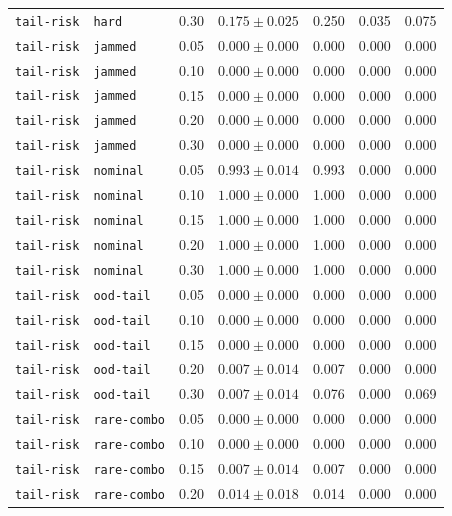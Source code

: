 \documentclass{article}
\begin{document}
\begin{center}
\begin{tabular}{lllcccc}
\texttt{tail-risk} & \texttt{hard} & 0.30 & $0.175 \pm 0.025$ & 0.250 & 0.035 & 0.075 \\
\texttt{tail-risk} & \texttt{jammed} & 0.05 & $0.000 \pm 0.000$ & 0.000 & 0.000 & 0.000 \\
\texttt{tail-risk} & \texttt{jammed} & 0.10 & $0.000 \pm 0.000$ & 0.000 & 0.000 & 0.000 \\
\texttt{tail-risk} & \texttt{jammed} & 0.15 & $0.000 \pm 0.000$ & 0.000 & 0.000 & 0.000 \\
\texttt{tail-risk} & \texttt{jammed} & 0.20 & $0.000 \pm 0.000$ & 0.000 & 0.000 & 0.000 \\
\texttt{tail-risk} & \texttt{jammed} & 0.30 & $0.000 \pm 0.000$ & 0.000 & 0.000 & 0.000 \\
\texttt{tail-risk} & \texttt{nominal} & 0.05 & $0.993 \pm 0.014$ & 0.993 & 0.000 & 0.000 \\
\texttt{tail-risk} & \texttt{nominal} & 0.10 & $1.000 \pm 0.000$ & 1.000 & 0.000 & 0.000 \\
\texttt{tail-risk} & \texttt{nominal} & 0.15 & $1.000 \pm 0.000$ & 1.000 & 0.000 & 0.000 \\
\texttt{tail-risk} & \texttt{nominal} & 0.20 & $1.000 \pm 0.000$ & 1.000 & 0.000 & 0.000 \\
\texttt{tail-risk} & \texttt{nominal} & 0.30 & $1.000 \pm 0.000$ & 1.000 & 0.000 & 0.000 \\
\texttt{tail-risk} & \texttt{ood-tail} & 0.05 & $0.000 \pm 0.000$ & 0.000 & 0.000 & 0.000 \\
\texttt{tail-risk} & \texttt{ood-tail} & 0.10 & $0.000 \pm 0.000$ & 0.000 & 0.000 & 0.000 \\
\texttt{tail-risk} & \texttt{ood-tail} & 0.15 & $0.000 \pm 0.000$ & 0.000 & 0.000 & 0.000 \\
\texttt{tail-risk} & \texttt{ood-tail} & 0.20 & $0.007 \pm 0.014$ & 0.007 & 0.000 & 0.000 \\
\texttt{tail-risk} & \texttt{ood-tail} & 0.30 & $0.007 \pm 0.014$ & 0.076 & 0.000 & 0.069 \\
\texttt{tail-risk} & \texttt{rare-combo} & 0.05 & $0.000 \pm 0.000$ & 0.000 & 0.000 & 0.000 \\
\texttt{tail-risk} & \texttt{rare-combo} & 0.10 & $0.000 \pm 0.000$ & 0.000 & 0.000 & 0.000 \\
\texttt{tail-risk} & \texttt{rare-combo} & 0.15 & $0.007 \pm 0.014$ & 0.007 & 0.000 & 0.000 \\
\texttt{tail-risk} & \texttt{rare-combo} & 0.20 & $0.014 \pm 0.018$ & 0.014 & 0.000 & 0.000 \\

\end{tabular}
\end{center}
\end{document}
